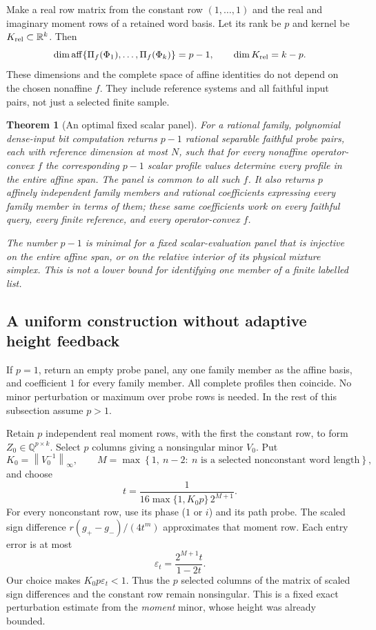 \documentclass[11pt,a4paper]{article}
\newtheorem{theorem}{Theorem}[section]
\theoremstyle{definition}\newtheorem{definition}[theorem]{Definition}
\newcommand{\Q}{\mathbb Q}
\newcommand{\R}{\mathbb R}
\newcommand{\norm}[1]{\left\lVert #1\right\rVert}
\begin{document}
Make a real row matrix from the constant row $(1,\ldots,1)$ and the real and imaginary moment rows of a retained word basis. Let its rank be $p$ and kernel be $K_{\rm rel}\subset\R^k$. Then
\[
 \dim\operatorname{aff}\{\Pi_f(\Phi_1),\ldots,\Pi_f(\Phi_k)\}=p-1,
 \qquad\dim K_{\rm rel}=k-p.
\]
These dimensions and the complete space of affine identities do not depend on the chosen nonaffine $f$. They include reference systems and all faithful input pairs, not just a selected finite sample.

\begin{theorem}[An optimal fixed scalar panel]\label{thm:panel}
For a rational family, polynomial dense-input bit computation returns $p-1$ rational separable faithful probe pairs, each with reference dimension at most $N$, such that for every nonaffine operator-convex $f$ the corresponding $p-1$ scalar profile values determine every profile in the entire affine span. The panel is common to all such $f$. It also returns $p$ affinely independent family members and rational coefficients expressing every family member in terms of them; these same coefficients work on every faithful query, every finite reference, and every operator-convex $f$.

The number $p-1$ is minimal for a fixed scalar-evaluation panel that is injective on the entire affine span, or on the relative interior of its physical mixture simplex. This is not a lower bound for identifying one member of a finite labelled list.
\end{theorem}

\subsection{A uniform construction without adaptive height feedback}

If $p=1$, return an empty probe panel, any one family member as the affine basis, and coefficient $1$ for every family member. All complete profiles then coincide. No minor perturbation or maximum over probe rows is needed. In the rest of this subsection assume $p>1$.

Retain $p$ independent real moment rows, with the first the constant row, to form $Z_0\in\Q^{p\times k}$. Select $p$ columns giving a nonsingular minor $V_0$. Put
\[
 K_0=\norm{V_0^{-1}}_{\infty},\qquad
 M=\max\left\{1,\ n-2:\ n\text{ is a selected nonconstant word length}\right\},
\]
and choose
\begin{equation}\label{eq:panel-t}
 t=\frac1{16\max\{1,K_0p\}\,2^{M+1}}.
\end{equation}
For every nonconstant row, use its phase ($1$ or $i$) and its path probe. The scaled sign difference $r(g_+-g_-)/(4t^m)$ approximates that moment row. Each entry error is at most
\[
 \varepsilon_t=\frac{2^{M+1}t}{1-2t}.
\]
Our choice makes $K_0p\varepsilon_t<1$. Thus the $p$ selected columns of the matrix of scaled sign differences and the constant row remain nonsingular. This is a fixed exact perturbation estimate from the \emph{moment} minor, whose height was already bounded.
\end{document}
